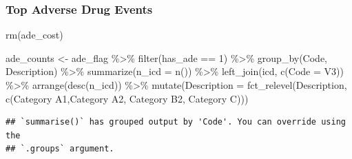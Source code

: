 \documentclass[preprint, 3p,
authoryear]{elsarticle} %
\newenvironment{Shaded}{\begin{snugshade}}{\end{snugshade}}
\newcommand{\AttributeTok}[1]{\textcolor[rgb]{0.77,0.63,0.00}{#1}}
\newcommand{\DecValTok}[1]{\textcolor[rgb]{0.00,0.00,0.81}{#1}}
\newcommand{\FunctionTok}[1]{\textcolor[rgb]{0.00,0.00,0.00}{#1}}
\newcommand{\NormalTok}[1]{#1}
\newcommand{\OtherTok}[1]{\textcolor[rgb]{0.56,0.35,0.01}{#1}}
\newcommand{\SpecialCharTok}[1]{\textcolor[rgb]{0.00,0.00,0.00}{#1}}
\newcommand{\StringTok}[1]{\textcolor[rgb]{0.31,0.60,0.02}{#1}}
\begin{document}
\hypertarget{top-adverse-drug-events}{%
\subsubsection{Top Adverse Drug Events}\label{top-adverse-drug-events}}

\begin{Shaded}
\begin{Highlighting}[]
\FunctionTok{rm}\NormalTok{(ade\_cost)}


\NormalTok{ade\_counts }\OtherTok{\textless{}{-}}\NormalTok{ ade\_flag }\SpecialCharTok{\%\textgreater{}\%}
  \FunctionTok{filter}\NormalTok{(has\_ade }\SpecialCharTok{==} \DecValTok{1}\NormalTok{) }\SpecialCharTok{\%\textgreater{}\%}
  \FunctionTok{group\_by}\NormalTok{(Code, Description) }\SpecialCharTok{\%\textgreater{}\%}
  \FunctionTok{summarize}\NormalTok{(}\AttributeTok{n\_icd =} \FunctionTok{n}\NormalTok{()) }\SpecialCharTok{\%\textgreater{}\%}
  \FunctionTok{left\_join}\NormalTok{(icd, }\FunctionTok{c}\NormalTok{(}\StringTok{\textquotesingle{}Code\textquotesingle{}} \OtherTok{=} \StringTok{\textquotesingle{}V3\textquotesingle{}}\NormalTok{)) }\SpecialCharTok{\%\textgreater{}\%}
  \FunctionTok{arrange}\NormalTok{(}\FunctionTok{desc}\NormalTok{(n\_icd)) }\SpecialCharTok{\%\textgreater{}\%}
  \FunctionTok{mutate}\NormalTok{(}\AttributeTok{Description =} \FunctionTok{fct\_relevel}\NormalTok{(Description, }\FunctionTok{c}\NormalTok{(}\StringTok{\textquotesingle{}Category A1\textquotesingle{}}\NormalTok{,}\StringTok{\textquotesingle{}Category A2\textquotesingle{}}\NormalTok{, }\StringTok{\textquotesingle{}Category B2\textquotesingle{}}\NormalTok{, }\StringTok{\textquotesingle{}Category C\textquotesingle{}}\NormalTok{)))}
\end{Highlighting}
\end{Shaded}

\begin{verbatim}
## `summarise()` has grouped output by 'Code'. You can override using the
## `.groups` argument.
\end{verbatim}
\end{document}
